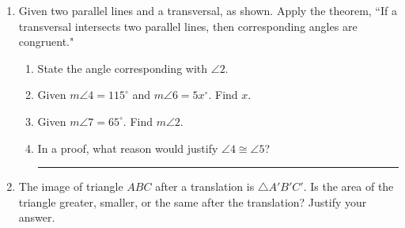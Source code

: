 \documentclass[12pt, twoside]{article}
\begin{document}
\begin{enumerate}
\newpage

  \item Given two parallel lines and a transversal, as shown. Apply the theorem, ``If a transversal intersects two parallel lines, then corresponding angles are congruent."
    \begin{center}
    \end{center}
    \begin{enumerate}
      \item State the angle corresponding with $\angle 2$. \vspace{1cm}
      \item Given $m\angle 4 = 115^\circ$ and $m\angle 6 = 5x^\circ$. Find $x$. \vspace{3cm}
      \item Given $m\angle 7 = 65^\circ$. Find $m\angle 2$. \vspace{2cm}
      \item In a proof, what reason would justify $\angle 4 \cong \angle 5$? \rule{6cm}{0.15mm}
    \end{enumerate}

    \item The image of triangle $ABC$ after a translation is $\triangle A'B'C'$. Is the area of the triangle greater, smaller, or the same after the translation? Justify your answer.

  \end{enumerate}

  
\end{document}

